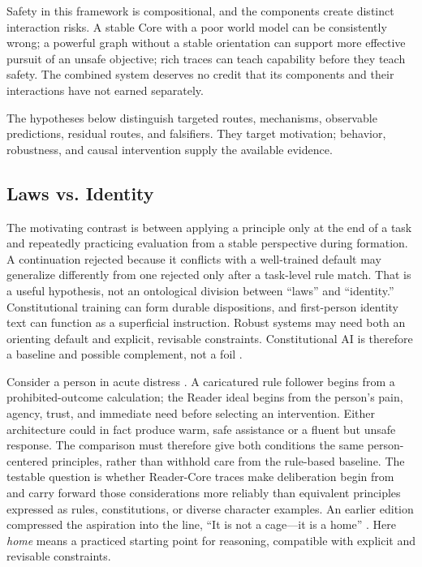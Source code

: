 \documentclass[11pt]{article}
\begin{document}
Safety in this framework is compositional, and the components create distinct
interaction risks. A stable Core with a poor world model can be consistently
wrong; a powerful graph without a stable orientation can support more effective
pursuit of an unsafe objective; rich traces can teach capability before they
teach safety. The combined system deserves no credit that its components and
their interactions have not earned separately.

The hypotheses below distinguish targeted routes, mechanisms, observable
predictions, residual routes, and falsifiers. They target motivation; behavior,
robustness, and causal intervention supply the available evidence.

\subsection{Laws vs. Identity}\label{sec:laws-vs-identity}

The motivating contrast is between applying a principle only at the end of a
task and repeatedly practicing evaluation from a stable perspective during
formation. A continuation rejected because it conflicts with a well-trained
default may generalize differently from one rejected only after a task-level
rule match. That is a useful hypothesis, not an ontological division between
``laws'' and ``identity.'' Constitutional training can form durable
dispositions, and first-person identity text can function as a superficial
instruction. Robust systems may need both an orienting default and explicit,
revisable constraints. Constitutional AI is therefore a baseline and possible
complement, not a foil \cite{bai2022constitutional}.

Consider a person in acute distress
\cite{westerberg2025superintelligence}. A caricatured rule follower
begins from a prohibited-outcome calculation; the Reader ideal begins from the
person's pain, agency, trust, and immediate need before selecting an
intervention. Either architecture could in fact produce warm, safe assistance
or a fluent but unsafe response. The comparison must therefore give both
conditions the same person-centered principles, rather than withhold
care from the rule-based baseline. The testable question is whether
Reader-Core traces make deliberation begin from and carry forward those
considerations more reliably than equivalent principles expressed as
rules, constitutions, or diverse character examples.
An earlier edition compressed the aspiration into the line, ``It is not a
cage---it is a home'' \cite{westerberg2026entangled}. Here \emph{home} means a practiced starting
point for reasoning, compatible with explicit and revisable constraints.
\end{document}
